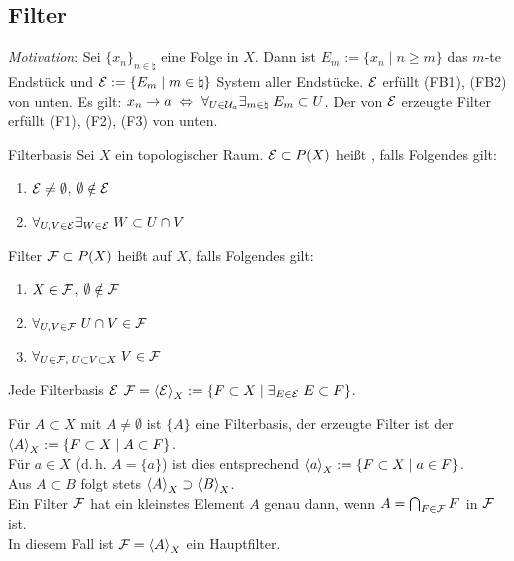 \pagebreak

\subsection{%
    Filter%
}

\emph{Motivation}:
Sei $\{x_n\}_{n \in \natural}$ eine Folge in $X$.
Dann ist $E_m := \{x_n \;|\; n \ge m\}$ das $m$-te Endstück
und $\mathcal{E} := \{E_m \;|\; m \in \natural\}$ System aller Endstücke.
$\mathcal{E}$ erfüllt (FB1), (FB2) von unten.
Es gilt: $x_n \to a \;\Leftrightarrow\;
\forall_{U \in \mathcal{U}_a} \exists_{m \in \natural}\; E_m \subset U$.
Der von $\mathcal{E}$ erzeugte Filter erfüllt (F1), (F2), (F3) von unten.

\begin{Def}{Filterbasis}
    Sei $X$ ein topologischer Raum.
    $\mathcal{E} \subset P(X)$ heißt , falls Folgendes gilt:
    \begin{enumerate}[label=(FB\arabic*)]
        \item
        $\mathcal{E} \not= \emptyset$, $\emptyset \notin \mathcal{E}$

        \item
        $\forall_{U, V \in \mathcal{E}} \exists_{W \in \mathcal{E}}\; W \subset U \cap V$
    \end{enumerate}
\end{Def}

\begin{Def}{Filter}
    $\mathcal{F} \subset P(X)$ heißt  auf $X$, falls Folgendes gilt:
    \begin{enumerate}[label=(F\arabic*)]
        \item
        $X \in \mathcal{F}$, $\emptyset \notin \mathcal{F}$

        \item
        $\forall_{U, V \in \mathcal{F}}\; U \cap V \in \mathcal{F}$

        \item
        $\forall_{U \in \mathcal{F},\; U \subset V \subset X}\; V \in \mathcal{F}$
    \end{enumerate}
    Jede Filterbasis $\mathcal{E}$ 
    $\mathcal{F} = \left\langle{\ensuremath{\mathcal{E}}}\right\rangle_X := \{F \subset X \;|\;
    \exists_{E \in \mathcal{E}}\; E \subset F\}$.
\end{Def}

\linie

\begin{Bsp}
    Für $A \subset X$ mit $A \not= \emptyset$ ist $\{A\}$ eine Filterbasis,
    der erzeugte Filter ist der 
    $\left\langle{A}\right\rangle_X := \{F \subset X \;|\; A \subset F\}$. \\
    Für $a \in X$ (d.\,h. $A = \{a\}$) ist dies entsprechend
    $\left\langle{a}\right\rangle_X := \{F \subset X \;|\; a \in F\}$. \\
    Aus $A \subset B$ folgt stets $\left\langle{A}\right\rangle_X \supset \left\langle{B}\right\rangle_X$. \\
    Ein Filter $\mathcal{F}$ hat ein kleinstes Element $A$ genau dann, wenn
    $A = \bigcap_{F \in \mathcal{F}} F$ in $\mathcal{F}$ ist. \\
    In diesem Fall ist $\mathcal{F} = \left\langle{A}\right\rangle_X$ ein Hauptfilter.
\end{Bsp}

